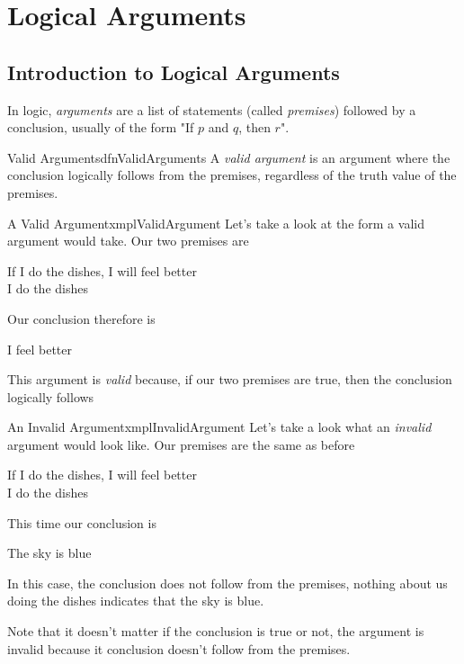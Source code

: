 \chapter{Logical Arguments}

\section{Introduction to Logical Arguments}
In logic, \emph{arguments} are a list of statements (called \emph{premises}) followed by a conclusion, usually of the form "If $p$ and $q$, then $r$".

\begin{dfn}[label={def:validArguments}]{Valid Arguments}{dfnValidArguments}
    A \emph{valid argument} is an argument where the conclusion logically follows from the premises, regardless of the truth value of the premises.
\end{dfn}

\begin{exmpl}[label={exmpl:validArgument}]{A Valid Argument}{xmplValidArgument}
    Let's take a look at the form a valid argument would take. Our two premises are
    \begin{center}
        If I do the dishes, I will feel better\\
        I do the dishes
    \end{center}
    Our conclusion therefore is
    \begin{center}
        I feel better
    \end{center}
    This argument is \emph{valid} because, if our two premises are true, then the conclusion logically follows
\end{exmpl}

\begin{exmpl}[label={exmpl:invalidArgument}]{An Invalid Argument}{xmplInvalidArgument}
    Let's take a look what an \emph{invalid} argument would look like. Our premises are the same as before
    \begin{center}
        If I do the dishes, I will feel better\\
        I do the dishes
    \end{center}
    This time our conclusion is
    \begin{center}
        The sky is blue
    \end{center}
    In this case, the conclusion does not follow from the premises, nothing about us doing the dishes indicates that the sky is blue.

    Note that it doesn't matter if the conclusion is true or not, the argument is invalid because it conclusion doesn't follow from the premises.
\end{exmpl}

